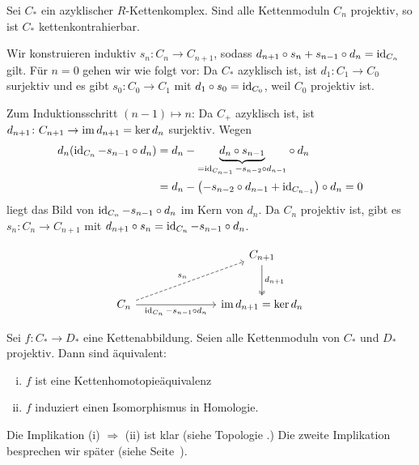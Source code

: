 \begin{satz}
	Sei $C_*$ ein azyklischer $R$-Kettenkomplex. Sind alle Kettenmoduln $C_n$ projektiv, so ist $C_*$ kettenkontrahierbar.
\end{satz}
\begin{beweis}
	Wir konstruieren induktiv $s_n \colon C_n \to C_{n+1}$, sodass $d_{n+1} \circ s_n + s_{n-1} \circ d_n = \operatorname{id}_{C_n}$ gilt. 	
	Für $n=0$ gehen wir wie folgt vor: Da $C_*$ azyklisch ist, ist $d_1 \colon C_1 \to C_0$ surjektiv und es gibt $s_0 \colon C_0 \to C_1$ mit $d_1 \circ s_0 = \operatorname{id}_{C_0}$, weil 
	$C_0$ projektiv ist.
	
	Zum Induktionsschritt $(n-1) \mapsto n$: Da $C_+$ azyklisch ist, ist $d_{n+1} \colon C_{n+1} \to \operatorname{im} d_{n+1}=\ker d_n$ surjektiv. Wegen
	\begin{align}
		d_n \enbrace*{\id_{C_n} - s_{n-1} \circ d_n} &= d_n - \Underbrace{d_n \circ s_{n-1}}{=\id_{C_{n-1}} - s_{n-2} \circ d_{n-1}} \circ d_n \\
		&= d_n - \enbrace*{- s_{n-2} \circ d_{n-1} + \id_{C_{n-1}}} \circ d_n =0
	\end{align}
	liegt das Bild von $\operatorname{id}_{C_n} - s_{n-1} \circ d_n$ im Kern von $d_n$. Da $C_n$ projektiv ist, gibt es $s_n \colon C_n \to C_{n+1}$ mit 
	$d_{n+1} \circ s_n = \operatorname{id}_{C_n} - s_{n-1} \circ d_n$.
	
	\[
		\begin{tikzcd}[column sep=2.5cm,row sep=large]
			\mbox{ } & C_{n+1} \dar["d_{n+1}",two heads] \\
			C_n \urar["s_n", dashed] \rar["\id_{C_n} - s_{n-1} \circ d_n"'] & \im d_{n+1} = \ker d_n
		\end{tikzcd}
	\]
\end{beweis}

\begin{satz}[label=satz:5:kettenhomotopie]
	Sei $f \colon C_* \to D_*$ eine Kettenabbildung. Seien alle Kettenmoduln von $C_*$ und $D_*$ projektiv. Dann sind äquivalent: 
	\begin{enumerate}[(i),itemsep=0pt]
		\item $f$ ist eine Kettenhomotopieäquivalenz
		\item $f$ induziert einen Isomorphismus in Homologie.
	\end{enumerate}
\end{satz}
\begin{beweis}
	Die Implikation (i) $\Rightarrow$ (ii) ist klar (siehe Topologie .) Die zweite Implikation besprechen wir später (siehe Seite~\pageref{bew:satz5}).
\end{beweis}

